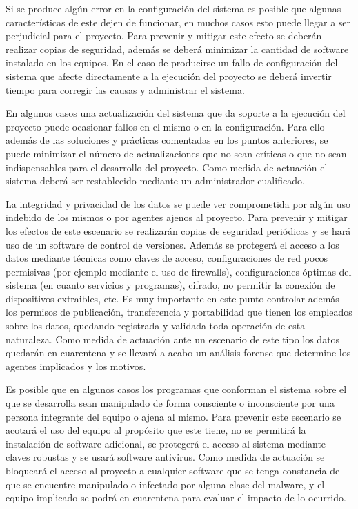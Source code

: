Si se produce algún error en la configuración del sistema es posible que algunas características de este dejen de funcionar, en muchos casos esto puede llegar a ser perjudicial para 
el proyecto. Para prevenir y mitigar este efecto se deberán realizar copias de seguridad, además se deberá minimizar la cantidad de software instalado en los equipos. En el caso de producirse un 
fallo de configuración del sistema que afecte directamente a la ejecución del proyecto se deberá invertir tiempo para corregir las causas y administrar el sistema.

En algunos casos una actualización del sistema que da soporte a la ejecución del proyecto puede ocasionar fallos en el mismo o en la configuración. Para ello además de 
las soluciones y prácticas comentadas en los puntos anteriores, se puede minimizar el número de actualizaciones que no sean críticas o que no sean indispensables para 
el desarrollo del proyecto. Como medida de actuación el sistema deberá ser restablecido mediante un administrador cualificado. 

La integridad y privacidad de los datos se puede ver comprometida por algún uso indebido de los mismos o por agentes ajenos al proyecto. Para prevenir y mitigar los efectos de este escenario 
se realizarán copias de seguridad  periódicas y se hará uso de un software de control de versiones. Además se protegerá el acceso a los datos mediante técnicas como claves de acceso, configuraciones de red pocos permisivas
(por ejemplo mediante el uso de firewalls), configuraciones óptimas del sistema (en cuanto servicios y programas), cifrado, no permitir la conexión de dispositivos extraibles, etc. Es muy importante en este punto 
controlar además los permisos de publicación, transferencia y portabilidad que tienen los empleados sobre los datos, quedando registrada y validada toda operación de esta naturaleza. Como medida de
actuación ante un escenario de este tipo los datos quedarán en cuarentena y se llevará a acabo un análisis forense que determine los agentes implicados y los motivos.

Es posible que en algunos casos los programas que conforman el sistema sobre el que se desarrolla sean manipulado de forma consciente o inconsciente por una persona integrante del equipo o ajena 
al mismo. Para prevenir este escenario se acotará el uso del equipo al propósito que este tiene, no se permitirá la instalación de software adicional, se protegerá el acceso al sistema mediante claves robustas y se 
usará software antivirus. Como medida de actuación se bloqueará el acceso al proyecto a cualquier software que se tenga constancia de que se encuentre manipulado o infectado por alguna clase del 
malware, y el equipo implicado se podrá en cuarentena para evaluar el impacto de lo ocurrido.  

